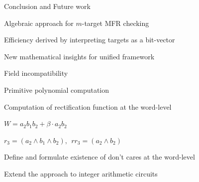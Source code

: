 
\begin{frame}{\large Conclusion and Future work}
\bi

	\item Algebraic approach for $m$-target MFR checking
	\bi
		\item Efficiency derived by interpreting targets as a bit-vector
	\ei
	\pause
	\item New mathematical insights for unified framework
	\bi
		\item Field incompatibility
		\item Primitive polynomial computation
	\ei
	\pause
	\vspace{0.1in}
	\vspace{0.1in}
	\item Computation of rectification function at the word-level
	\bi
		\item $W = a_2b_1b_2 + \beta \cdot a_2b_2$
		\item $r_3 = (a_2 \wedge b_1 \wedge b_2),~~rr_3 = (a_2 \wedge b_2)$
	\ei
	\pause
	\item Define and formulate existence of don't cares at the word-level
	\pause
	\item Extend the approach to integer arithmetic circuits
\ei
\end{frame}



